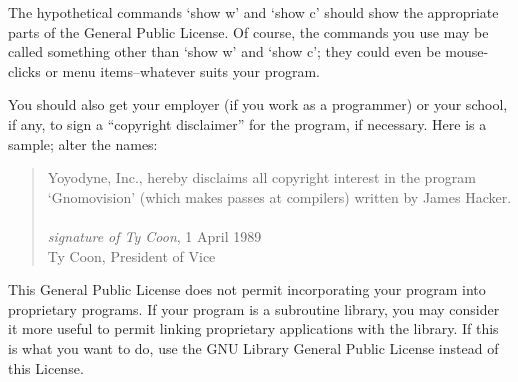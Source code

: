 \documentclass{uw-wkrpt}
\begin{document}
\begin{appendices}
\begin{singlespacing}
The hypothetical commands `show w' and `show c' should show the appropriate
parts of the General Public License.  Of course, the commands you use may
be called something other than `show w' and `show c'; they could even be
mouse-clicks or menu items--whatever suits your program.

You should also get your employer (if you work as a programmer) or your
school, if any, to sign a ``copyright disclaimer'' for the program, if
necessary.  Here is a sample; alter the names:
\begin{quote}\ttfamily\footnotesize
  Yoyodyne, Inc., hereby disclaims all copyright interest in the program\\
  `Gnomovision' (which makes passes at compilers) written by James Hacker.\\
\mbox{}\\
  \emph{signature of Ty Coon}, 1 April 1989\\
  Ty Coon, President of Vice
\end{quote}

This General Public License does not permit incorporating your program into
proprietary programs.  If your program is a subroutine library, you may
consider it more useful to permit linking proprietary applications with the
library.  If this is what you want to do, use the GNU Library General
Public License instead of this License.

\end{singlespacing}

\end{appendices}
\end{document}
